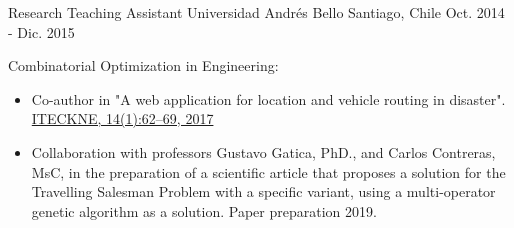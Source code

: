 
\begin{cventries}

  \cventry
    {Research Teaching Assistant} %
    {Universidad Andrés Bello} %
    {Santiago, Chile} %
    {Oct. 2014 - Dic. 2015} %
    {
      \begin{cvitems} %
      	\item {Combinatorial Optimization in Engineering:}
      		\begin{itemize}
      			\item {Co-author in "A web application for location and vehicle routing in disaster". \href{http://revistas.ustabuca.edu.co/index.php/ITECKNE/article/view/1631}{ITECKNE, 14(1):62–69, 2017}}
      			\item {Collaboration with professors Gustavo Gatica, PhD., and Carlos Contreras, MsC, in the preparation of a scientific article that proposes a solution for the Travelling Salesman Problem with a specific variant, using a multi-operator genetic algorithm as a solution. Paper preparation 2019.}
      		\end{itemize}
      \end{cvitems}
    }
\end{cventries}
